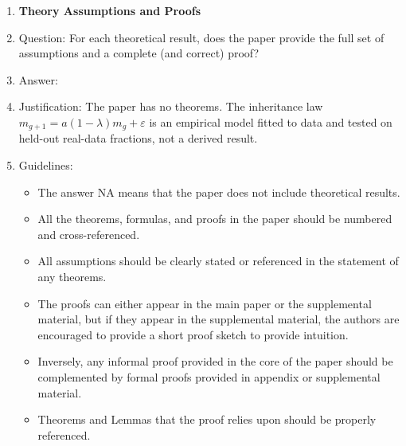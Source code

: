 \begin{enumerate}
\item {\bf Theory Assumptions and Proofs}
    \item[] Question: For each theoretical result, does the paper provide the full set of assumptions and a complete (and correct) proof?
    \item[] Answer: \answerNA{}
    \item[] Justification: The paper has no theorems. The inheritance law $m_{g+1} = a(1-\lambda)m_g + \varepsilon$ is an empirical model fitted to data and tested on held-out real-data fractions, not a derived result.
    \item[] Guidelines:
    \begin{itemize}
        \item The answer NA means that the paper does not include theoretical results.
        \item All the theorems, formulas, and proofs in the paper should be numbered and cross-referenced.
        \item All assumptions should be clearly stated or referenced in the statement of any theorems.
        \item The proofs can either appear in the main paper or the supplemental material, but if they appear in the supplemental material, the authors are encouraged to provide a short proof sketch to provide intuition.
        \item Inversely, any informal proof provided in the core of the paper should be complemented by formal proofs provided in appendix or supplemental material.
        \item Theorems and Lemmas that the proof relies upon should be properly referenced.
    \end{itemize}


\end{enumerate}
